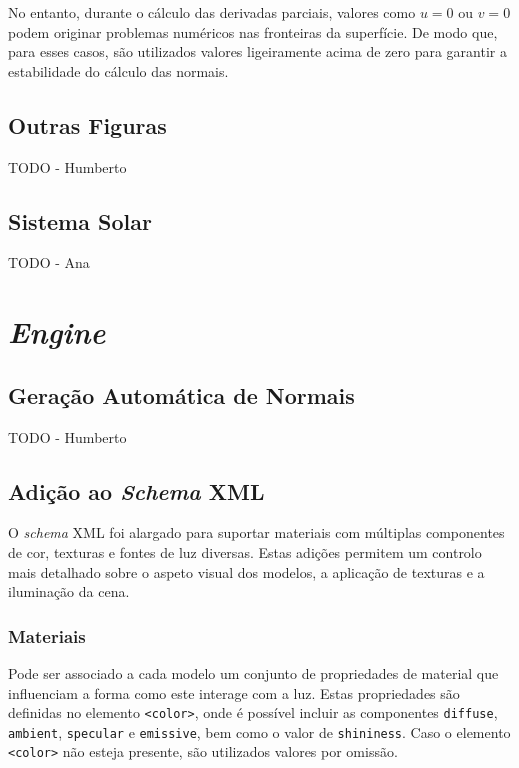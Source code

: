 \documentclass[12pt, a4paper]{article}
\begin{document}
No entanto, durante o cálculo das derivadas parciais, valores como $u = 0$ ou $v = 0$ podem
originar problemas numéricos nas fronteiras da superfície. De modo que, para esses casos, são
utilizados valores ligeiramente acima de zero para garantir a estabilidade do cálculo das normais.

\subsection{Outras Figuras}

{\color{red} TODO - Humberto}

\subsection{Sistema Solar}

{\color{red} TODO - Ana}

\section{\emph{Engine}}

\subsection{Geração Automática de Normais}

{\color{red} TODO - Humberto}

\subsection{Adição ao \emph{Schema} XML}

O \emph{schema} XML foi alargado para suportar materiais com múltiplas componentes de cor, texturas
e fontes de luz diversas. Estas adições permitem um controlo mais detalhado sobre o aspeto visual
dos modelos, a aplicação de texturas e a iluminação da cena.

\subsubsection{Materiais}

Pode ser associado a cada modelo um conjunto de propriedades de material que influenciam a forma
como este interage com a luz. Estas propriedades são definidas no elemento \texttt{<color>}, onde é
possível incluir as componentes \texttt{diffuse}, \texttt{ambient}, \texttt{specular} e
\texttt{emissive}, bem como o valor de \texttt{shininess}. Caso o elemento \texttt{<color>} não
esteja presente, são utilizados valores por omissão.
\end{document}
